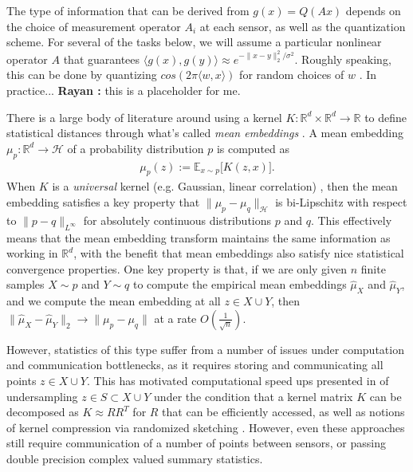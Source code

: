 \documentclass{article}
\newcommand{\comment}[3]{{\color{#1} {\bf #2 :} #3}}
\newcommand{\rayan}[1]{\comment{red}{Rayan}{#1}}
\newcommand{\R}{\mathbb{R}}
\begin{document}
The type of information that can be derived from $g(x)=Q(Ax)$ depends on the choice of measurement operator $A_i$ at each sensor, as well as the quantization scheme.  For several of the tasks below, we will assume a particular nonlinear operator $A$ that guarantees $\langle g(x), g(y) \rangle \approx e^{-\|x-y\|_2^2/\sigma^2}$.  Roughly speaking, this can be done by quantizing $cos(2\pi \langle w, x \rangle)$ for random choices of $w$ \cite{rahimi2008random}. In practice... \rayan{this is a placeholder for me.} 

There is a large body of literature around using a kernel $K:\mathbb{R}^d\times \mathbb{R}^d \rightarrow \mathbb{R}$ to define statistical distances through what's called \emph{mean embeddings} \cite{muandet2017kernel}.  A mean embedding $\mu_p:\mathbb{R}^d\rightarrow \mathcal{H}$ of a probability distribution $p$ is computed as
\begin{align*}
    \mu_p(z) := \mathbb{E}_{x\sim p} \big[K(z,x)\big].
\end{align*}
When $K$ is a \emph{universal} kernel (e.g. Gaussian, linear correlation) \cite{micchelli2006universal}, then the mean embedding satisfies a key property that $\|\mu_p - \mu_q\|_\mathcal{H}$ is bi-Lipschitz with respect to $\|p - q\|_{L^{\infty}}$ for absolutely continuous distributions $p$ and $q$.  This effectively means that the mean embedding transform maintains the same information as working in $\R^d$, with the benefit that mean embeddings also satisfy nice statistical convergence properties.  One key property is that, if we are only given $n$ finite samples $X\sim p$ and $Y\sim q$ to compute the empirical mean embeddings $\widehat{\mu}_X$ and $\widehat{\mu}_Y$, and we compute the mean embedding at all $z\in X\cup Y$, then $\|\widehat{\mu}_X - \widehat{\mu}_Y\|_2 \rightarrow \|\mu_p - \mu_q\|$ at a rate $O\left(\frac{1}{\sqrt{n}}\right)$.

However, statistics of this type suffer from a number of issues under computation and communication bottlenecks, as it requires storing and communicating all points $z\in X\cup Y$.  This has motivated computational speed ups presented in \cite{cheng2017two} of undersampling $z\in S\subset X\cup Y$ under the condition that a kernel matrix $K$ can be decomposed as $K\approx RR^T$ for $R$ that can be efficiently accessed, as well as notions of kernel compression via randomized sketching \cite{gribonval2017compressive}.  However, even these approaches still require communication of a number of points between sensors, or passing double precision complex valued summary statistics.  
\end{document}
